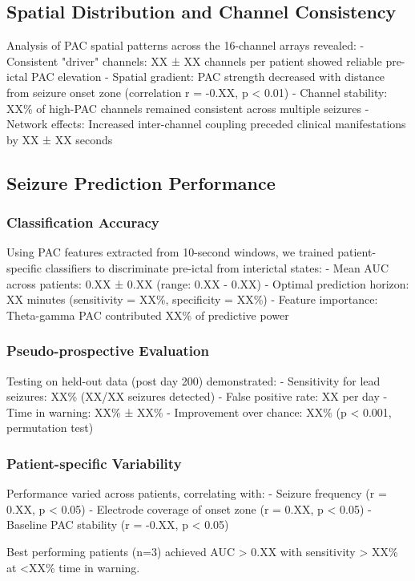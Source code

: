 \subsection{Spatial Distribution and Channel Consistency}

Analysis of PAC spatial patterns across the 16-channel arrays revealed:
- Consistent "driver" channels: XX ± XX channels per patient showed reliable pre-ictal PAC elevation
- Spatial gradient: PAC strength decreased with distance from seizure onset zone (correlation r = -0.XX, p < 0.01)
- Channel stability: XX\% of high-PAC channels remained consistent across multiple seizures
- Network effects: Increased inter-channel coupling preceded clinical manifestations by XX ± XX seconds

\subsection{Seizure Prediction Performance}

\subsubsection{Classification Accuracy}
Using PAC features extracted from 10-second windows, we trained patient-specific classifiers to discriminate pre-ictal from interictal states:
- Mean AUC across patients: 0.XX ± 0.XX (range: 0.XX - 0.XX)
- Optimal prediction horizon: XX minutes (sensitivity = XX\%, specificity = XX\%)
- Feature importance: Theta-gamma PAC contributed XX\% of predictive power

\subsubsection{Pseudo-prospective Evaluation}
Testing on held-out data (post day 200) demonstrated:
- Sensitivity for lead seizures: XX\% (XX/XX seizures detected)
- False positive rate: XX per day
- Time in warning: XX\% ± XX\%
- Improvement over chance: XX\% (p < 0.001, permutation test)

\subsubsection{Patient-specific Variability}
Performance varied across patients, correlating with:
- Seizure frequency (r = 0.XX, p < 0.05)
- Electrode coverage of onset zone (r = 0.XX, p < 0.05)
- Baseline PAC stability (r = -0.XX, p < 0.05)

Best performing patients (n=3) achieved AUC > 0.XX with sensitivity > XX\% at <XX\% time in warning.

